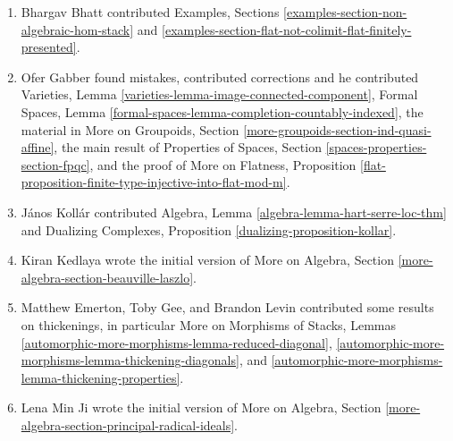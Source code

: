 \begin{enumerate}
\item Bhargav Bhatt contributed Examples, Sections
\ref{examples-section-non-algebraic-hom-stack} and
\ref{examples-section-flat-not-colimit-flat-finitely-presented}.
\item Ofer Gabber found mistakes, contributed corrections and he
contributed
Varieties, Lemma \ref{varieties-lemma-image-connected-component},
Formal Spaces, Lemma \ref{formal-spaces-lemma-completion-countably-indexed},
the material in
More on Groupoids, Section \ref{more-groupoids-section-ind-quasi-affine},
the main result of
Properties of Spaces, Section \ref{spaces-properties-section-fpqc},
and the proof of
More on Flatness, Proposition
\ref{flat-proposition-finite-type-injective-into-flat-mod-m}.
\item J\'anos Koll\'ar contributed
Algebra, Lemma \ref{algebra-lemma-hart-serre-loc-thm} and
Dualizing Complexes, Proposition \ref{dualizing-proposition-kollar}.
\item Kiran Kedlaya wrote the initial version of
More on Algebra, Section \ref{more-algebra-section-beauville-laszlo}.
\item Matthew Emerton, Toby Gee, and Brandon Levin contributed
some results on thickenings, in particular
More on Morphisms of Stacks, Lemmas
\ref{automorphic-more-morphisms-lemma-reduced-diagonal},
\ref{automorphic-more-morphisms-lemma-thickening-diagonals}, and
\ref{automorphic-more-morphisms-lemma-thickening-properties}.
\item Lena Min Ji wrote the initial version of
More on Algebra, Section \ref{more-algebra-section-principal-radical-ideals}.
\end{enumerate}









